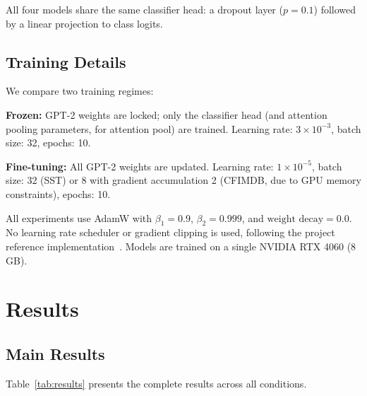 \documentclass[9pt,twocolumn,twoside,lineno]{gsag3jnl}
\begin{document}
All four models share the same classifier head: a dropout layer ($p=0.1$) followed by a linear projection to class logits.

\subsection{Training Details}

We compare two training regimes:

\textbf{Frozen:} GPT-2 weights are locked; only the classifier head (and attention pooling parameters, for attention pool) are trained. Learning rate: $3 \times 10^{-3}$, batch size: 32, epochs: 10.

\textbf{Fine-tuning:} All GPT-2 weights are updated. Learning rate: $1 \times 10^{-5}$, batch size: 32 (SST) or 8 with gradient accumulation 2 (CFIMDB, due to GPU memory constraints), epochs: 10.

All experiments use AdamW with $\beta_1 = 0.9$, $\beta_2 = 0.999$, and $\text{weight decay} = 0.0$. No learning rate scheduler or gradient clipping is used, following the project reference implementation~\citep{cs224n2024}. Models are trained on a single NVIDIA RTX 4060 (8 GB).

\section{Results}

\subsection{Main Results}

Table~\ref{tab:results} presents the complete results across all conditions.
\end{document}
